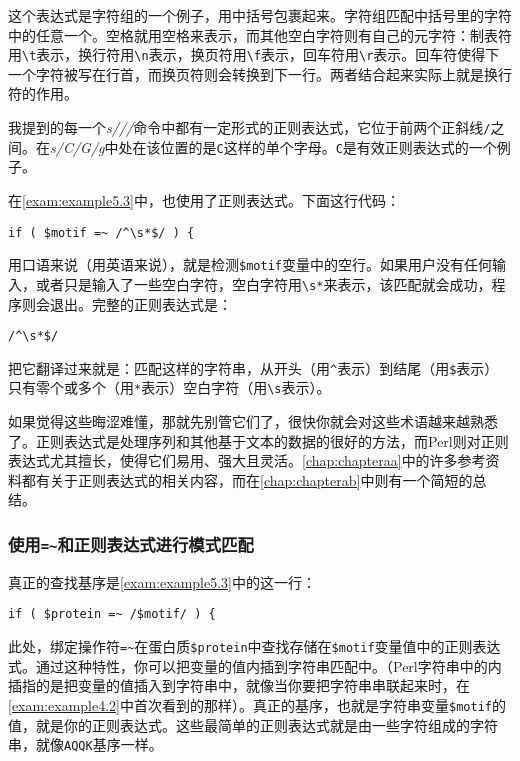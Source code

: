这个表达式是字符组的一个例子，用中括号包裹起来。字符组匹配中括号里的字符中的任意一个。空格就用空格来表示，而其他空白字符则有自己的元字符：制表符用\verb|\t|表示，换行符用\verb|\n|表示，换页符用\verb|\f|表示，回车符用\verb|\r|表示。回车符使得下一个字符被写在行首，而换页符则会转换到下一行。两者结合起来实际上就是换行符的作用。

我提到的每一个\textit{s///}命令中都有一定形式的正则表达式，它位于前两个正斜线\verb|/|之间。在\textit{s/C/G/g}中处在该位置的是\verb|C|这样的单个字母。\verb|C|是有效正则表达式的一个例子。

在\autoref{exam:example5.3}中，也使用了正则表达式。下面这行代码：

\begin{lstlisting}
if ( $motif =~ /^\s*$/ ) {
\end{lstlisting}

用口语来说（用英语来说），就是检测\verb|$motif|变量中的空行。如果用户没有任何输入，或者只是输入了一些空白字符，空白字符用\verb|\s*|来表示，该匹配就会成功，程序则会退出。完整的正则表达式是：

\begin{lstlisting}
/^\s*$/
\end{lstlisting}

把它翻译过来就是：匹配这样的字符串，从开头（用\verb|^|表示）到结尾（用\verb|$|表示）只有零个或多个（用\verb|*|表示）空白字符（用\verb|\s|表示）。

如果觉得这些晦涩难懂，那就先别管它们了，很快你就会对这些术语越来越熟悉了。正则表达式是处理序列和其他基于文本的数据的很好的方法，而Perl则对正则表达式尤其擅长，使得它们易用、强大且灵活。\autoref{chap:chapteraa}中的许多参考资料都有关于正则表达式的相关内容，而在\autoref{chap:chapterab}中则有一个简短的总结。

\cprotect \subsubsection{使用\verb|=~|和正则表达式进行模式匹配}
真正的查找基序是\autoref{exam:example5.3}中的这一行： 

\begin{lstlisting}
if ( $protein =~ /$motif/ ) {
\end{lstlisting}

此处，绑定操作符\verb|=~|在蛋白质\verb|$protein|中查找存储在\verb|$motif|变量值中的正则表达式。通过这种特性，你可以把变量的值内插到字符串匹配中。（Perl字符串中的内插指的是把变量的值插入到字符串中，就像当你要把字符串串联起来时，在\autoref{exam:example4.2}中首次看到的那样）。真正的基序，也就是字符串变量\verb|$motif|的值，就是你的正则表达式。这些最简单的正则表达式就是由一些字符组成的字符串，就像\verb|AQQK|基序一样。

